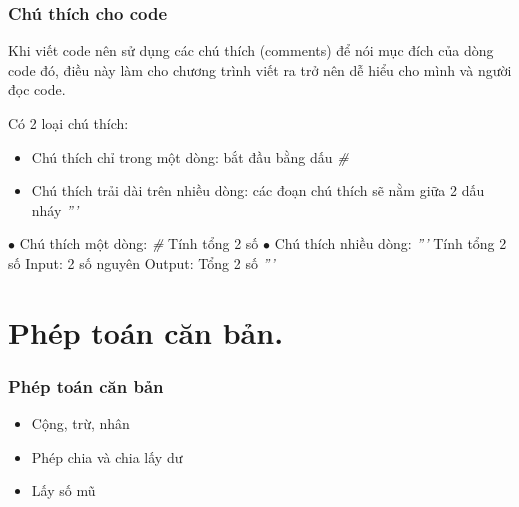 \documentclass{beamer}
\begin{document}
\begin{frame}[label=chuthich]
\frametitle{Chú thích cho code}
Khi viết code nên sử dụng các chú thích (comments) để nói mục đích của dòng code đó, điều này làm cho chương trình viết ra trở nên dễ hiểu cho mình và người đọc code.
 
Có 2 loại chú thích:
\begin{itemize}
\item Chú thích chỉ trong một dòng: bắt đầu bằng dấu \textit{\#}
\item Chú thích trải dài trên nhiều dòng: các đoạn chú thích sẽ nằm giữa 2 dấu nháy \textit{'''}
\end{itemize}
\begin{example}
$\bullet$ Chú thích một dòng: \textit{\#} Tính tổng 2 số \newline
$\bullet$ Chú thích nhiều dòng: \newline \textit{'''} Tính tổng 2 số \newline Input: 2 số nguyên \newline Output: Tổng 2 số \textit{'''}
\end{example} 
\hyperlink{cuphap}{}
\end{frame}

\section{Phép toán căn bản.}
\begin{frame}[label=pheptoan]
\frametitle{Phép toán căn bản}

\begin{itemize}
\item Cộng, trừ, nhân \hyperlink{congtru}{\beamerbutton{$\unrhd$}}
\item Phép chia và chia lấy dư  \hyperlink{phepchia}{\beamerbutton{$\unrhd$}}
\item Lấy số mũ \hyperlink{laysomu}{\beamerbutton{$\unrhd$}}
\end{itemize}

\hyperlink{intro}{}
\hyperlink{cautrucdulieu}{}
\end{frame}
\end{document}
